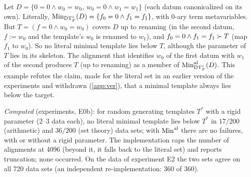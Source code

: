 \begin{example}\label{ex:setting:align}
Let $D=\{0=0\wedge w_0=w_0,\ w_0=0\wedge w_1=w_1\}$ (each datum canonicalized on its own). Literally, $\mathrm{Min}_{\mathrm{DT}^{\circ}_{F}}(D)=\{f_0=0\wedge f_1=f_1\}$, with $0$-ary term metavariables. But $T=(f=0\wedge w_0=w_0)$ covers $D$ up to renaming (in the second datum, $f:=w_0$ and the template's $w_0$ is renamed to $w_1$), and $f_0=0\wedge f_1=f_1\succ T$ (map $f_1$ to $w_0$). So no literal minimal template lies below $T$, although the parameter of $T$ lies in its skeleton. The alignment that identifies $w_0$ of the first datum with $w_1$ of the second produces $T$ (up to renaming) as a member of $\mathrm{Min}^{\mathrm{al}}_{\mathrm{DT}^{\circ}_{F}}(D)$. This example refutes the claim, made for the literal set in an earlier version of the experiments and withdrawn (\cref{app:ver}), that a minimal template always lies below the target.

\emph{Computed} (experiments, E0b): for random generating templates $T^*$ with a rigid parameter (2--3 data each), no literal minimal template lies below $T^*$ in $17/200$ (arithmetic) and $36/200$ (set theory) data sets; with $\mathrm{Min}^{\mathrm{al}}$ there are no failures, with or without a rigid parameter. The implementation caps the number of alignments at 4096 (beyond it, it falls back to the literal set) and reports truncation; none occurred. On the data of experiment E2 the two sets agree on all 720 data sets (an independent re-implementation: 360 of 360).
\end{example}

